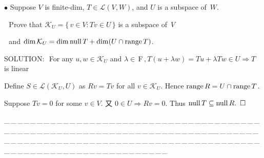 \documentclass[a4paper, 11pt, UTF8]{article}
\def\range{\textup{range}\,}
\def\null{\textup{null\,}}
\def\Lm{\mathcal{L}}
\def\Fbf{$\,{\timesbf F}\,$}
\begin{document}
\begin{large}
{\small $\bullet$} {\timessl\Large 
Suppose $V$ is finite-dim, $T\in\Lm(V, W)$, and $U$ is a subspace of \,$W$.}\par\,\,
{\timessl\Large Prove that $\mathcal{K}_U=\{\,v\in V: Tv\in U\,\}$ is a subspace of \,$V$}\par\,\,
{\timessl\Large and $\dim\mathcal{K}_U=\dim\null T +\dim(U\cap\range T)$.
}\par
{\timesbf S\footnotesize{OLUTION:}}\,\,\,\,For any $u,w\in\mathcal{K}_U$ and $\lambda\in\Fbf,T(u+\lambda w)=Tu+\lambda Tw\in U\Rightarrow T$ is linear\par\qquad\qquad\quad
Define $S\in\Lm(\mathcal{K}_U,U)$ as $Rv=Tv$ for all $v\in\mathcal{K}_U$. Hence $\range R=U\cap \range T$.\par\qquad\qquad\quad
Suppose $Tv=0$ for some $v\in V$. 又 $0\in U\Rightarrow Rv=0$. Thus $\null T\subseteq\null R.\,\,\,\square$\par
{\tiny \_\,\_\,\_\,\_\,\_\,\_\,\_\,\_\,\_\,\_\,\_\,\_\,\_\,\_\,\_\,\_\,\_\,\_\,\_\,\_\,\_\,\_\,\_\,\_\,\_\,\_\,\_\,\_\,\_\,\_\,\_\,\_\,\_\,\_\,\_\,\_\,\_\,\_\,\_\,\_\,\_\,\_\,\_\,\_\,\_\,\_\,\_\,\_\,\_\,\_\,\_\,\_\,\_\,\_\,\_\,\_\,\_\,\_\,\_\,\_\,\_\,\_\,\_\,\_\,\_\,\_\,\_\,\_\,\_\,\_\,\_\_\,\_\,\_\,\_\,\_\,\_\,\_\,\_\,\_\,\_\,\_\,\_\,\_\,\_\,\_\,\_\,\_\,\_\,\_\,\_\,\_\,\_\,\_\,\_\,\_\,\_\,\_\,\_\,\_\,\_\,\_\,\_\,\_\,\_\,\_\,\_\,\_\,\_\,\_\,\_\,\_\,\_\,\_\,\_\,\_\,\_\,\_\,\_\,\_\,\_\,\_\,\_\,\_\,\_\,\_\,\_\,\_\,\_\,\_\,\_\,\_\,\_\,\_\,\_\,\_\,\_\,\_\,\_\,\_\,\_\,\_}\par\,\par{\tiny\,\par}


\end{large}
\end{document}
